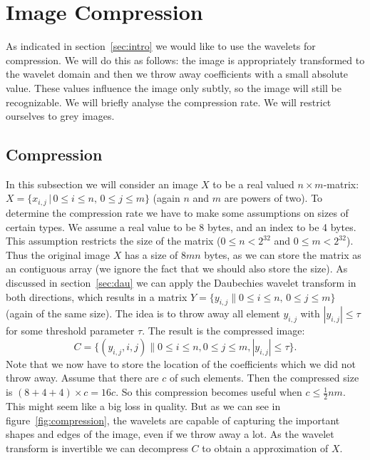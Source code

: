 
\section{Image Compression}
\label{sec:img}

As indicated in section~\ref{sec:intro} we would like to use the wavelets for compression. We will do this as follows: the image is appropriately transformed to the wavelet domain and then we throw away coefficients with a small absolute value. These values influence the image only subtly, so the image will still be recognizable. We will briefly analyse the compression rate. We will restrict ourselves to grey images.

\subsection{Compression}
In this subsection we will consider an image $X$ to be a real valued $n \times m$-matrix: $X = \{x_{i,j} \,|\, 0 \leq i \leq n,\, 0 \leq j \leq m\}$ (again $n$ and $m$ are powers of two). To determine the compression rate we have to make some assumptions on sizes of certain types. We assume a real value to be 8 bytes, and an index to be 4 bytes. This assumption restricts the size of the matrix ($0 \leq n < 2^{32}$ and $0 \leq m < 2^{32}$). Thus the original image $X$ has a size of $8mn$ bytes, as we can store the matrix as an contiguous array (we ignore the fact that we should also store the size). As discussed in section~\ref{sec:dau} we can apply the Daubechies wavelet transform in both directions, which results in a matrix $Y = \{y_{i,j} \| 0 \leq i \leq n,\, 0 \leq j \leq m\}$ (again of the same size). The idea is to throw away all element $y_{i,j}$ with $|y_{i,j}| \leq \tau$ for some threshold parameter $\tau$. The result is the compressed image:
\[ C = \{ (y_{i,j}, i, j) \| 0 \leq i \leq n, 0 \leq j \leq m, |y_{i,j}| \leq \tau \}. \]
Note that we now have to store the location of the coefficients which we did not throw away. Assume that there are $c$ of such elements. Then the compressed size is $(8+4+4) \times c = 16 c$. So this compression becomes useful when $c \leq \frac{1}{2}nm$. This might seem like a big loss in quality. But as we can see in figure~\ref{fig:compression}, the wavelets are capable of capturing the important shapes and edges of the image, even if we throw away a lot. As the wavelet transform is invertible we can decompress $C$ to obtain a approximation of $X$.

